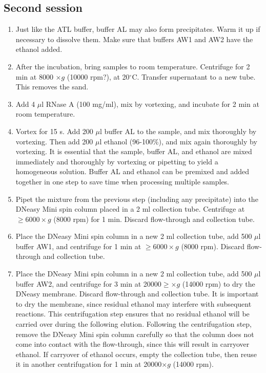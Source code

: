 \documentclass[a4paper,12pt]{article}
\begin{document}
\subsection{Second session}
\begin{enumerate}
\item Just like the ATL buffer, buffer AL may also form precipitates. Warm it up if necessary to dissolve them. Make sure that buffers AW1 and AW2 have the ethanol added.
\item After the incubation, bring samples to room temperature. Centrifuge for 2 min at 8000 $\times g$ (10000 rpm?), at 20$^\circ$C. Transfer supernatant to a new tube. This removes the sand.
\item Add 4 $\mu$l RNase A (100 mg/ml), mix by vortexing, and incubate for 2 min at room temperature.
\item Vortex for 15 s. Add 200 $\mu$l buffer AL to the sample, and mix thoroughly by vortexing. Then add 200 $\mu$l ethanol (96-100\%), and mix again thoroughly by vortexing. It is essential that the sample, buffer AL, and ethanol are mixed immediately and thoroughly by vortexing or pipetting to yield a homogeneous solution. Buffer AL and ethanol can be premixed and added together in one step to save time when processing multiple samples.
\item Pipet the mixture from the previous step (including any precipitate) into the DNeasy Mini spin column placed in a 2 ml collection tube. Centrifuge at $\geq6000 \times g$ (8000 rpm) for 1 min. Discard flow-through and collection tube. 
\item Place the DNeasy Mini spin column in a new 2 ml collection tube, add 500 $\mu$l buffer AW1, and centrifuge for 1 min at $\geq6000 \times g$ (8000 rpm). Discard flow-through and collection tube.
\item Place the DNeasy Mini spin column in a new 2 ml collection tube, add 500 $\mu$l buffer AW2, and centrifuge for 3 min at 20000$\geq \times g$ (14000 rpm) to dry the DNeasy membrane. Discard flow-through and collection tube. It is important to dry the membrane, since residual ethanol may interfere with subsequent reactions. This centrifugation step ensures that no residual ethanol will be carried over during the following elution. Following the centrifugation step, remove the DNeasy Mini spin column carefully so that the column does not come into contact with the flow-through, since this will result in carryover ethanol. If carryover of ethanol occurs, empty the collection tube, then reuse it in another centrifugation for 1 min at 20000$\times g$ (14000 rpm).

\end{enumerate}
\end{document}
